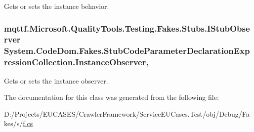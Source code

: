 Gets or sets the instance behavior.

\hypertarget{class_system_1_1_code_dom_1_1_fakes_1_1_stub_code_parameter_declaration_expression_collection_aaff4c57e70ba13cfd21d745f06fd22dc}{
\subsubsection[{Instance\-Observer}]{\setlength{\rightskip}{0pt plus 5cm}mqttf.\-Microsoft.\-Quality\-Tools.\-Testing.\-Fakes.\-Stubs.\-I\-Stub\-Observer System.\-Code\-Dom.\-Fakes.\-Stub\-Code\-Parameter\-Declaration\-Expression\-Collection.\-Instance\-Observer\hspace{0.3cm}{\ttfamily [get]}, {\ttfamily [set]}}}\label{class_system_1_1_code_dom_1_1_fakes_1_1_stub_code_parameter_declaration_expression_collection_aaff4c57e70ba13cfd21d745f06fd22dc}


Gets or sets the instance observer.



The documentation for this class was generated from the following file\-:\begin{DoxyCompactItemize}
\item 
D\-:/\-Projects/\-E\-U\-C\-A\-S\-E\-S/\-Crawler\-Framework/\-Service\-E\-U\-Cases.\-Test/obj/\-Debug/\-Fakes/s/\hyperlink{s_2f_8cs}{f.\-cs}\end{DoxyCompactItemize}
